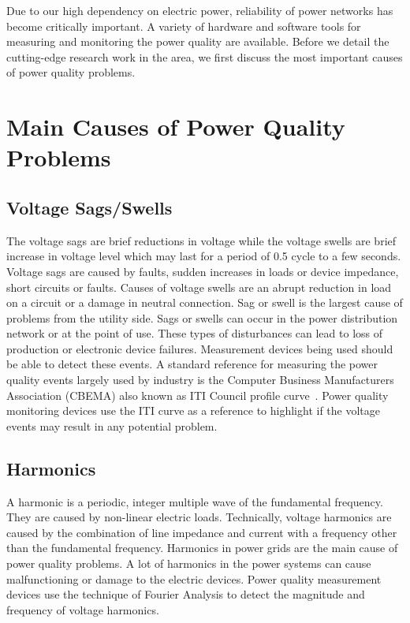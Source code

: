 \label{chap:review}
Due to our high dependency on electric power, reliability of power networks has become critically important. A variety of hardware and software tools for measuring and monitoring the power quality are available. Before we detail the cutting-edge research work in the area, we first discuss the most important causes of power quality problems.

\section{Main Causes of Power Quality Problems}
\subsection{Voltage Sags/Swells}
The voltage sags are brief reductions in voltage while the voltage swells are brief increase in voltage level which may last for a period of 0.5 cycle to a few seconds. Voltage sags are caused by faults, sudden increases in loads or device impedance, short circuits or faults. Causes of voltage swells are an abrupt reduction in load on a circuit or a damage in neutral connection. Sag or swell is the largest cause of problems from the utility side. Sags or swells can occur in the power distribution network or at the point of use. These types of disturbances can lead to loss of production or electronic device failures. Measurement devices being used should be able to detect these events. A standard reference for measuring the power quality events largely used by industry is the Computer Business Manufacturers Association (CBEMA) also known as ITI Council profile curve~\cite{iti_curve}. Power quality monitoring devices use the ITI curve as a reference to highlight if the voltage events may result in any potential problem.

\subsection{Harmonics}
A harmonic is a periodic, integer multiple wave of the fundamental frequency. They are caused by non-linear electric loads. Technically, voltage harmonics are caused by the combination of line impedance and current with a frequency other than the fundamental frequency. Harmonics in power grids are the main cause of power quality problems. A lot of harmonics in the power systems can cause malfunctioning or damage to the electric devices. Power quality measurement devices use the technique of Fourier Analysis to detect the magnitude and frequency of voltage harmonics.

